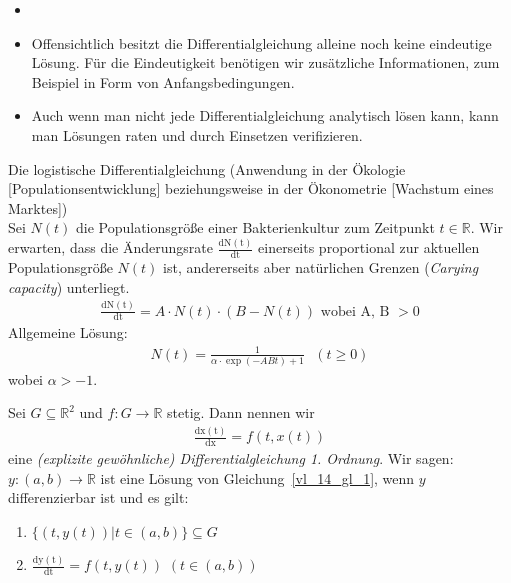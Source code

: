 \begin{Bemerkung}{
	\begin{itemize}
		\item[ ]
		\item Offensichtlich besitzt die Differentialgleichung alleine noch keine 
		eindeutige Lösung. Für die Eindeutigkeit benötigen wir zusätzliche
		 Informationen, zum Beispiel in Form von Anfangsbedingungen.
		\item Auch wenn man nicht jede Differentialgleichung analytisch lösen kann, 
		kann man Lösungen raten und durch Einsetzen verifizieren.
	\end{itemize}
}\end{Bemerkung}

\begin{Beispiel}{
	Die logistische Differentialgleichung (Anwendung in der Ökologie 
	[Populationsentwicklung] beziehungsweise in der Ökonometrie [Wachstum 
	eines Marktes]) \\
	Sei $N(t)$ die Populationsgröße einer Bakterienkultur zum Zeitpunkt $t \in 
	\mathbb{R}$. Wir erwarten, dass die Änderungsrate $\frac{\mathrm{dN(t)}}{\mathrm{dt}}$ einerseits proportional zur aktuellen Populationsgröße $N(t)$ ist, 
	andererseits aber natürlichen Grenzen (\emph{Carying capacity}) unterliegt.
	\begin{align*}
		\frac{\mathrm{dN(t)}}{\mathrm{dt}} = A \cdot N(t) \cdot (B - N(t))
		\text{ wobei A, B } > 0
	\end{align*}
	Allgemeine Lösung:
	\begin{align*}
		N(t) = \frac{1}{\alpha \cdot \exp(-ABt) + 1} \text{ }(t \geq 0) 
	\end{align*}
	wobei $\alpha > -1$.
}\end{Beispiel}

\begin{Definition}{
	Sei $G \subseteq \mathbb{R}^2$ und $f : G \rightarrow \mathbb{R}$ stetig. Dann 
	nennen wir
	\begin{align}\label{vl_14_gl_1}
		\frac{\mathrm{dx(t)}}{\mathrm{dx}} = f(t,x(t))
	\end{align}
	eine \emph{(explizite gewöhnliche) Differentialgleichung 1. Ordnung}. Wir 
	sagen:\\
		$y : (a,b) \rightarrow \mathbb{R}$ ist eine Lösung von 
	Gleichung~\ref{vl_14_gl_1}, wenn $y$ differenzierbar ist und es gilt:
	\renewcommand{\labelenumi}{\roman{enumi})}
	\begin{enumerate}
		\item\label{vl_14_punkt_i} $\{(t,y(t)) \vert t \in (a,b)\} \subseteq G$
		\item\label{vl_14_punkt_ii} 
			$\frac{\mathrm{dy(t)}}{\mathrm{dt}} = f(t, y(t))$ $(t \in (a,b))$
	\end{enumerate}
}\end{Definition}

